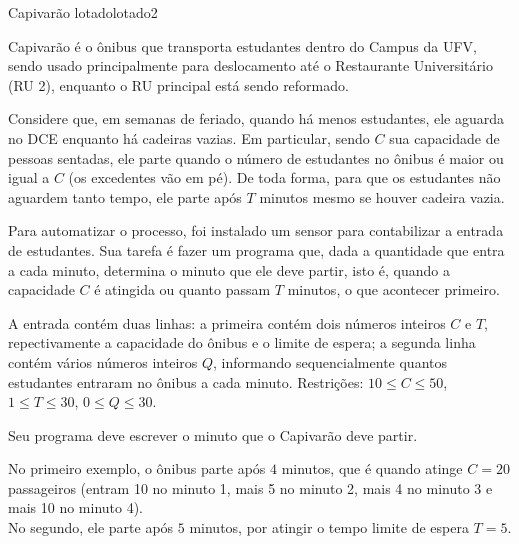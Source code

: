 \documentclass[12pt,a4paper,oneside]{article}
\begin{document}
\begin{problem}{Capivarão lotado}{lotado}{2}

Capivarão é o ônibus que transporta estudantes dentro do Campus da UFV, sendo usado principalmente para deslocamento até o Restaurante Universitário (RU 2), enquanto o RU principal está sendo reformado.

Considere que, em semanas de feriado, quando há menos estudantes, ele aguarda no DCE enquanto há cadeiras vazias.
Em particular, sendo $C$ sua capacidade de pessoas sentadas, ele parte quando o número de estudantes no ônibus é maior ou igual a $C$ (os excedentes vão em pé).
De toda forma, para que os estudantes não aguardem tanto tempo, ele parte após $T$ minutos mesmo se houver cadeira vazia.

Para automatizar o processo, foi instalado um sensor para contabilizar a entrada de estudantes. Sua tarefa é fazer um programa que, dada a quantidade que entra a cada minuto, determina o minuto que ele deve partir,
isto é, quando a capacidade $C$ é atingida ou quanto passam $T$ minutos, o que acontecer primeiro.

%

\InputFile

A entrada contém duas linhas: a primeira contém dois números inteiros $C$ e $T$, repectivamente a capacidade do ônibus e o limite de espera;
a segunda linha contém vários números inteiros $Q$, informando sequencialmente quantos estudantes entraram no ônibus a cada minuto.
Restrições: $10 \leq C \leq 50$, $1 \leq T \leq 30$, $0 \leq Q \leq 30$.

\OutputFile

Seu programa deve escrever o minuto que o Capivarão deve partir.


\Example

\begin{example}
%
\end{example}

\begin{example}
%
\end{example}

\begin{example}
%
\end{example}

\small
No primeiro exemplo, o ônibus parte após $4$ minutos, que é quando atinge $C=20$ passageiros (entram 10 no minuto 1, mais 5 no minuto 2, mais 4 no minuto 3 e mais 10 no minuto 4).\\
No segundo, ele parte após $5$ minutos, por atingir o tempo limite de espera $T=5$.\\

\end{problem}
\end{document}
